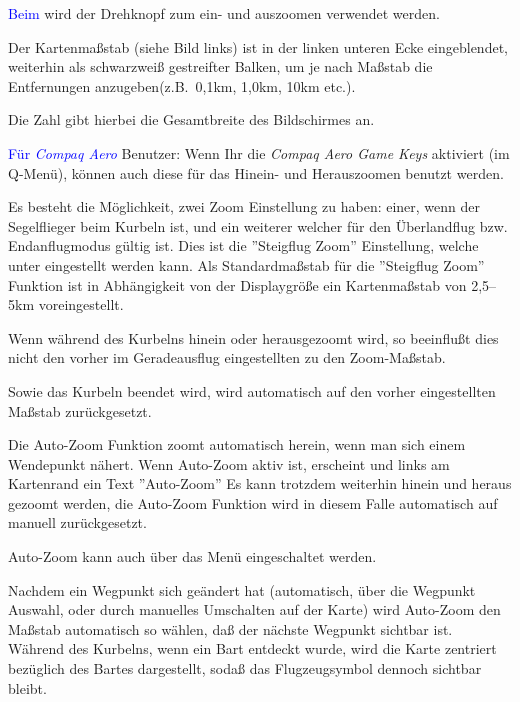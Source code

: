 \textcolor{blue}{Beim \al} wird der Drehknopf zum ein- und auszoomen verwendet werden.

Der Kartenmaßstab (siehe Bild links)  ist in der linken unteren Ecke eingeblendet, weiterhin als schwarzweiß 
gestreifter Balken, um je nach Maßstab die Entfernungen anzugeben(z.B.\ 0,1km, 1,0km, 10km etc.).

Die Zahl gibt hierbei die Gesamtbreite des Bildschirmes an.

\textcolor{blue}{Für \textsl{Compaq Aero}} Benutzer: Wenn Ihr die \textsl{Compaq Aero Game Keys} aktiviert (im Q-Menü), können auch diese für das Hinein- und Herauszoomen benutzt werden.

Es besteht die Möglichkeit, zwei Zoom Einstellung zu haben: einer, wenn der Segelflieger  beim Kurbeln ist, und ein weiterer welcher für den Überlandflug bzw. Endanflugmodus gültig ist.
Dies ist die ''Steigflug Zoom'' Einstellung, welche unter  eingestellt werden kann.
Als Standardmaßstab für die ''Steigflug Zoom'' Funktion ist in Abhängigkeit von der Displaygröße ein Kartenmaßstab von 2,5--5km voreingestellt.

Wenn während des Kurbelns hinein oder herausgezoomt wird,  so beeinflußt dies nicht den vorher im 
Geradeausflug eingestellten zu den Zoom-Maßstab. 

Sowie das Kurbeln beendet wird, wird automatisch auf  den vorher eingestellten Maßstab zurückgesetzt.

Die Auto-Zoom Funktion zoomt automatisch herein, wenn man sich einem Wendepunkt nähert. Wenn Auto-Zoom aktiv ist, erscheint und links am Kartenrand ein Text ''Auto-Zoom''
Es kann trotzdem weiterhin hinein und heraus gezoomt werden,  
die Auto-Zoom Funktion wird in diesem Falle automatisch auf manuell zurückgesetzt.


Auto-Zoom kann auch \"uber das Men\"u eingeschaltet werden. 

Nachdem ein Wegpunkt sich geändert hat (automatisch, über die Wegpunkt Auswahl, oder durch manuelles Umschalten auf der Karte) wird Auto-Zoom den Maßstab automatisch so wählen, daß der nächste Wegpunkt sichtbar ist. Während des Kurbelns, wenn ein Bart entdeckt wurde, wird die Karte zentriert bezüglich des Bartes dargestellt, sodaß das Flugzeugsymbol dennoch sichtbar bleibt.

